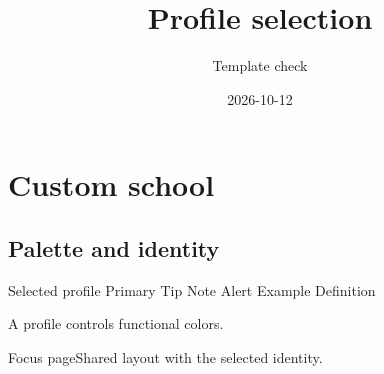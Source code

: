 \documentclass[theme=fixture-brand,language=english]{campusbeamer}
\title{Profile selection}
\author{Template check}
\date{2026-10-12}
\begin{document}
\maketitle
\section{Custom school}
\subsection{Palette and identity}
\begin{frame}{Selected profile}
  \textcolor{maincolor}{Primary}
  \textcolor{tipcolor}{Tip}
  \textcolor{notecolor}{Note}
  \textcolor{alertcolor}{Alert}
  \textcolor{examplecolor}{Example}
  \textcolor{definitioncolor}{Definition}
  \begin{tipbox}A profile controls functional colors.\end{tipbox}
  \fitgraphic[width=.3,height=.1]{\schoolwordmarkonlight}
\end{frame}
\begin{frame}[campusfocus]{Focus page}Shared layout with the selected identity.\end{frame}
\backmatter
\end{document}
